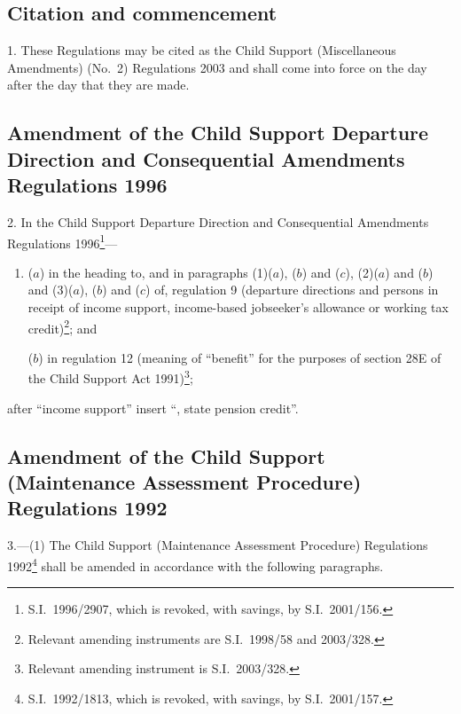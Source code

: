 \documentclass[12pt,a4paper]{article}
\begin{document}
{\sloppy

\tableofcontents

}

\bigskip

\setcounter{secnumdepth}{-2}

\subsection[1. Citation and commencement]{Citation and commencement}

1.  These Regulations may be cited as the Child Support (Miscellaneous Amendments) (No.\ 2) Regulations 2003 and shall come into force on the day after the day that they are made.

\subsection[2. Amendment of the Child Support Departure Direction and Consequential Amendments Regulations 1996]{Amendment of the Child Support Departure Direction and Consequential Amendments Regulations 1996}

2.  In the Child Support Departure Direction and Consequential Amendments Regulations 1996\footnote{S.I.\ 1996/2907, which is revoked, with savings, by S.I.\ 2001/156.}—
\begin{enumerate}\item[]
($a$) in the heading to, and in paragraphs (1)($a$), ($b$)  and ($c$), (2)($a$)  and ($b$)  and (3)($a$), ($b$)  and ($c$)  of, regulation 9 (departure directions and persons in receipt of income support, income-based jobseeker’s allowance or working tax credit)\footnote{Relevant amending instruments are S.I.\ 1998/58 and 2003/328.}; and

($b$) in regulation 12 (meaning of “benefit” for the purposes of section 28E of the Child Support Act 1991)\footnote{Relevant amending instrument is S.I.\ 2003/328.};
\end{enumerate}
after “income support” insert “, state pension credit”.

\subsection[3. Amendment of the Child Support (Maintenance Assessment Procedure) Regulations 1992]{Amendment of the Child Support (Maintenance Assessment Procedure) Regulations 1992}

3.---(1)  The Child Support (Maintenance Assessment Procedure) Regulations 1992\footnote{S.I.\ 1992/1813, which is revoked, with savings, by S.I.\ 2001/157.} shall be amended in accordance with the following paragraphs.
\end{document}
